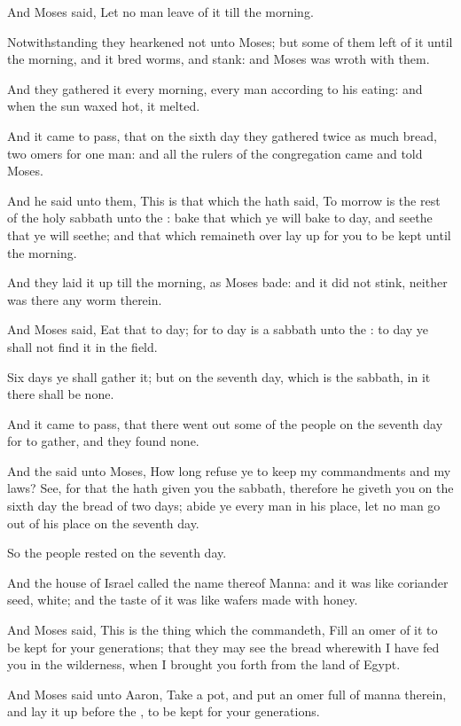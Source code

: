 \Verse And Moses said, Let no man leave of it till the morning.

\Verse Notwithstanding they hearkened not unto Moses; but some of them left of it until the morning, and it bred worms, and stank: and Moses was wroth with them.

\Verse And they gathered it every morning, every man according to his eating: and when the sun waxed hot, it melted.

\Verse And it came to pass, that on the sixth day they gathered twice as much bread, two omers for one man: and all the rulers of the congregation came and told Moses.

\Verse And he said unto them, This is that which the \LORD hath said, To morrow is the rest of the holy sabbath unto the \LORD: bake that which ye will bake to day, and seethe that ye will seethe; and that which remaineth over lay up for you to be kept until the morning.

\Verse And they laid it up till the morning, as Moses bade: and it did not stink, neither was there any worm therein.

\Verse And Moses said, Eat that to day; for to day is a sabbath unto the \LORD: to day ye shall not find it in the field.

\Verse Six days ye shall gather it; but on the seventh day, which is the sabbath, in it there shall be none.

\Verse And it came to pass, that there went out some of the people on the seventh day for to gather, and they found none.

\Verse And the \LORD said unto Moses, How long refuse ye to keep my commandments and my laws?  \Verse See, for that the \LORD hath given you the sabbath, therefore he giveth you on the sixth day the bread of two days; abide ye every man in his place, let no man go out of his place on the seventh day.

\Verse So the people rested on the seventh day.

\Verse And the house of Israel called the name thereof Manna: and it was like coriander seed, white; and the taste of it was like wafers made with honey.

\Verse And Moses said, This is the thing which the \LORD commandeth, Fill an omer of it to be kept for your generations; that they may see the bread wherewith I have fed you in the wilderness, when I brought you forth from the land of Egypt.

\Verse And Moses said unto Aaron, Take a pot, and put an omer full of manna therein, and lay it up before the \LORD, to be kept for your generations.

